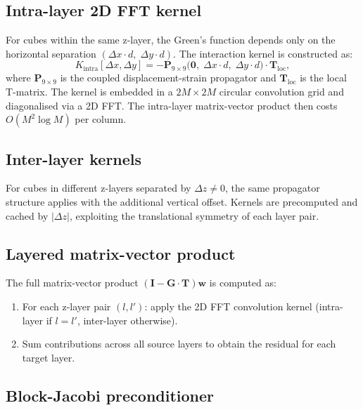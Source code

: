 \documentclass[11pt,a4paper]{article}
\theoremstyle{plain}
\theoremstyle{remark}
\begin{document}
\subsection{Intra-layer 2D FFT kernel}

For cubes within the same z-layer, the Green's function depends only on
the horizontal separation $(\Delta x \cdot d,\; \Delta y \cdot d)$.
The interaction kernel is constructed as:
\begin{equation}\label{eq:intra-kernel}
  K_{\mathrm{intra}}[\Delta x, \Delta y]
  = -\mathbf{P}_{9\times 9}\bigl(\mathbf{0},\; \Delta x \cdot d,\;
    \Delta y \cdot d\bigr) \cdot \mathbf{T}_{\mathrm{loc}},
\end{equation}
where $\mathbf{P}_{9\times 9}$ is the coupled displacement-strain
propagator and $\mathbf{T}_{\mathrm{loc}}$ is the local T-matrix.  The
kernel is embedded in a $2M \times 2M$ circular convolution grid and
diagonalised via a 2D FFT.  The intra-layer matrix-vector product then
costs $O(M^2 \log M)$ per column.

\subsection{Inter-layer kernels}

For cubes in different z-layers separated by $\Delta z \ne 0$, the
same propagator structure applies with the additional vertical offset.
Kernels are precomputed and cached by $|\Delta z|$, exploiting the
translational symmetry of each layer pair.

\subsection{Layered matrix-vector product}

The full matrix-vector product $(\mathbf{I} - \mathbf{G}\cdot
\mathbf{T})\mathbf{w}$ is computed as:
\begin{enumerate}[nosep]
  \item For each z-layer pair $(l, l')$: apply the 2D FFT convolution
    kernel (intra-layer if $l = l'$, inter-layer otherwise).
  \item Sum contributions across all source layers to obtain the
    residual for each target layer.
\end{enumerate}

\subsection{Block-Jacobi preconditioner}
\end{document}
